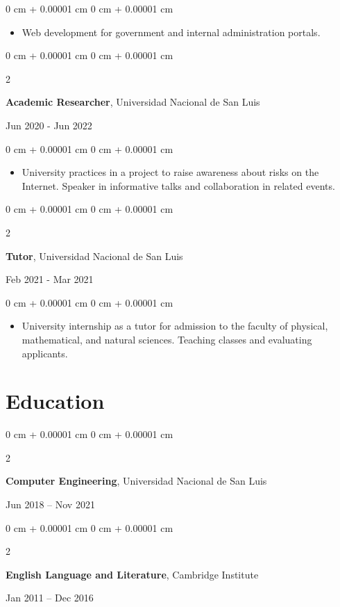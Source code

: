 \documentclass[10pt, letterpaper]{article}
\newenvironment{highlights}{
    \begin{itemize}[
        topsep=0.10 cm,
        parsep=0.10 cm,
        partopsep=0pt,
        itemsep=0pt,
        leftmargin=0 cm + 10pt
    ]
}{
    \end{itemize}
} %
\newenvironment{onecolentry}{
    \begin{adjustwidth}{
        0 cm + 0.00001 cm
    }{
        0 cm + 0.00001 cm
    }
}{
    \end{adjustwidth}
} %
\newenvironment{twocolentry}[2][]{
    \onecolentry
    \def\secondColumn{#2}
    \setcolumnwidth{\fill, 4.5 cm}
    \begin{paracol}{2}
}{
    \switchcolumn \raggedleft \secondColumn
    \end{paracol}
    \endonecolentry
} %
\begin{document}
    \vspace{0.10 cm}
    \begin{onecolentry}
        \begin{highlights}
            \item Web development for government and internal administration portals.
        \end{highlights}
    \end{onecolentry}
    \vspace{0.2 cm}
    \begin{twocolentry}{
            Jun 2020 - Jun 2022
        }
        \textbf{Academic Researcher}, Universidad Nacional de San Luis
    \end{twocolentry}
    \vspace{0.10 cm}
    \begin{onecolentry}
        \begin{highlights}
            \item University practices in a project to raise awareness about risks on the Internet. Speaker in informative talks and collaboration in related events.
        \end{highlights}
    \end{onecolentry}
    \vspace{0.2 cm}
    \begin{twocolentry}{
            Feb 2021 - Mar 2021
        }
        \textbf{Tutor}, Universidad Nacional de San Luis
    \end{twocolentry}
    \vspace{0.10 cm}
    \begin{onecolentry}
        \begin{highlights}
            \item University internship as a tutor for admission to the faculty of physical, mathematical, and natural sciences. Teaching classes and evaluating applicants.
        \end{highlights}
    \end{onecolentry}
    \vspace{0.2 cm}
    \section{Education}                   
    \begin{twocolentry}{
        Jun 2018 – Nov 2021
    }
    \textbf{Computer Engineering}, Universidad Nacional de San Luis
    \end{twocolentry}
    \begin{twocolentry}{
            Jan 2011 – Dec 2016
        }
        \textbf{English Language and Literature}, Cambridge Institute
    \end{twocolentry}
\end{document}

